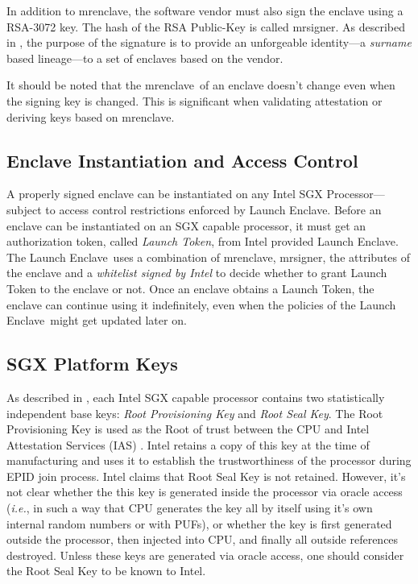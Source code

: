 \documentclass[10pt]{article}
\newcommand{\ie}{\textit{i.e.}}
\newcommand{\mrenclave}{\textsf{mrenclave}}
\newcommand{\mrsigner}{\textsf{mrsigner}}
\newcommand{\launchenclave}{\textsf{Launch Enclave}}
\begin{document}
  In addition to \textsf{mrenclave}, the software vendor must
  also sign the enclave using a RSA-3072 key. The hash of the RSA
  Public-Key is called \mrsigner. As described in \cite{surnaming},
  the purpose of the signature is to provide an unforgeable
  identity---a \textit{surname} based lineage---to a set of enclaves
  based on the vendor.

  It should be noted that the \mrenclave\ of an enclave doesn't
  change even when the signing key is changed. This is significant
  when validating attestation or deriving keys based on
  \mrenclave.

  \subsection{Enclave Instantiation and Access Control}
  A properly signed enclave can be instantiated on any Intel
  SGX Processor---subject to access control restrictions enforced
  by \launchenclave. Before an enclave can be instantiated on an SGX capable
  processor, it must get an authorization token,
  called \textit{Launch Token}, from Intel provided \launchenclave. The
  \launchenclave\ uses a combination of \mrenclave, \mrsigner, the
  attributes of the enclave and a \textit{whitelist signed by Intel} to decide
  whether to grant Launch Token to the enclave or not. Once an
  enclave obtains a Launch Token, the enclave  can continue
  using it indefinitely, even when the policies of the \launchenclave\
  might get updated later on.

  \subsection{SGX Platform Keys}
  As described in \cite{sgxattest}, each Intel SGX capable processor
  contains two statistically independent base keys:
  \textit{Root Provisioning Key} and \textit{Root Seal Key}. The Root
  Provisioning Key is used as the Root of trust between the CPU and
  Intel Attestation Services (IAS) \cite{ias}. Intel retains a copy
  of this key at the time of manufacturing and uses it to establish
  the trustworthiness of the processor during EPID join process. Intel
  claims that Root Seal Key is not retained. However, it's not clear
  whether the this key is generated inside the processor via oracle
  access (\ie, in such a way that CPU generates the key all by itself
  using it's own internal random numbers or with PUFs), or whether the
  key is first generated outside the processor, then injected into CPU,
  and finally all outside references destroyed. Unless these keys are
  generated via oracle access, one should consider the Root Seal Key
  to be known to Intel.
\end{document}
